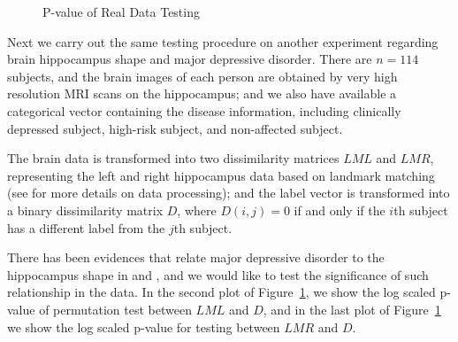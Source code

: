\documentclass[11pt]{article}
\begin{document}
\begin{figure}[htbp]
\centering
{}
\hfil
\centering
{}
\hfil
\centering
{}
\caption{P-value of Real Data Testing}
\label{figReal}
\end{figure}

Next we carry out the same testing procedure on another experiment regarding brain hippocampus shape and major depressive disorder. There are $n=114$ subjects, and the brain images of each person are obtained by very high resolution MRI scans on the hippocampus; and we also have available a categorical vector containing the disease information, including clinically depressed subject, high-risk subject, and non-affected subject. 

The brain data is transformed into two dissimilarity matrices $LML$ and $LMR$, representing the left and right hippocampus data based on landmark matching (see \cite{ParkEtAl2011} for more details on data processing); and the label vector is transformed into a binary dissimilarity matrix $D$, where $D(i,j)=0$ if and only if the $i$th subject has a different label from the $j$th subject.

There has been evidences that relate major depressive disorder to the hippocampus shape in \cite{ParkEtAl2011} and \cite{PosenerEtAl2003}, and we would like to test the significance of such relationship in the data. In the second plot of Figure~\ref{figReal}, we show the log scaled p-value of permutation test between $LML$ and $D$, and in the last plot of Figure~\ref{figReal} we show the log scaled p-value for testing between $LMR$ and $D$. 
\end{document}
